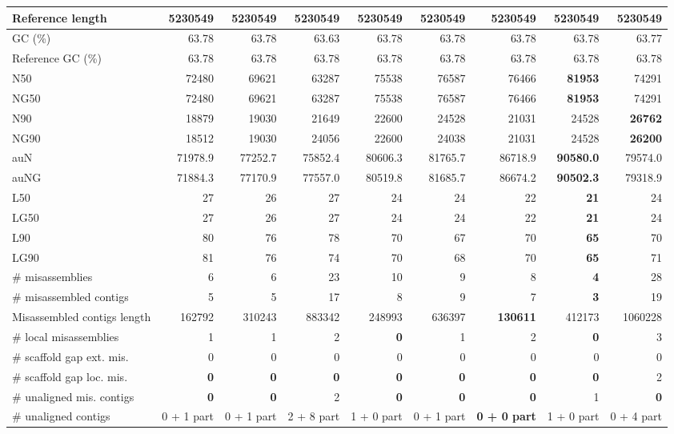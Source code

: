 \documentclass[12pt,a4paper]{article}
\begin{document}
\begin{table}[ht]
\begin{center}
\begin{tabular}{|l*{8}{|r}|}
Reference length & 5230549 & 5230549 & 5230549 & 5230549 & 5230549 & 5230549 & 5230549 & 5230549 \\ \hline
GC (\%) & 63.78 & 63.78 & 63.63 & 63.78 & 63.78 & 63.78 & 63.78 & 63.77 \\ \hline
Reference GC (\%) & 63.78 & 63.78 & 63.78 & 63.78 & 63.78 & 63.78 & 63.78 & 63.78 \\ \hline
N50 & 72480 & 69621 & 63287 & 75538 & 76587 & 76466 & {\bf 81953} & 74291 \\ \hline
NG50 & 72480 & 69621 & 63287 & 75538 & 76587 & 76466 & {\bf 81953} & 74291 \\ \hline
N90 & 18879 & 19030 & 21649 & 22600 & 24528 & 21031 & 24528 & {\bf 26762} \\ \hline
NG90 & 18512 & 19030 & 24056 & 22600 & 24038 & 21031 & 24528 & {\bf 26200} \\ \hline
auN & 71978.9 & 77252.7 & 75852.4 & 80606.3 & 81765.7 & 86718.9 & {\bf 90580.0} & 79574.0 \\ \hline
auNG & 71884.3 & 77170.9 & 77557.0 & 80519.8 & 81685.7 & 86674.2 & {\bf 90502.3} & 79318.9 \\ \hline
L50 & 27 & 26 & 27 & 24 & 24 & 22 & {\bf 21} & 24 \\ \hline
LG50 & 27 & 26 & 27 & 24 & 24 & 22 & {\bf 21} & 24 \\ \hline
L90 & 80 & 76 & 78 & 70 & 67 & 70 & {\bf 65} & 70 \\ \hline
LG90 & 81 & 76 & 74 & 70 & 68 & 70 & {\bf 65} & 71 \\ \hline
\# misassemblies & 6 & 6 & 23 & 10 & 9 & 8 & {\bf 4} & 28 \\ \hline
\# misassembled contigs & 5 & 5 & 17 & 8 & 9 & 7 & {\bf 3} & 19 \\ \hline
Misassembled contigs length & 162792 & 310243 & 883342 & 248993 & 636397 & {\bf 130611} & 412173 & 1060228 \\ \hline
\# local misassemblies & 1 & 1 & 2 & {\bf 0} & 1 & 2 & {\bf 0} & 3 \\ \hline
\# scaffold gap ext. mis. & 0 & 0 & 0 & 0 & 0 & 0 & 0 & 0 \\ \hline
\# scaffold gap loc. mis. & {\bf 0} & {\bf 0} & {\bf 0} & {\bf 0} & {\bf 0} & {\bf 0} & {\bf 0} & 2 \\ \hline
\# unaligned mis. contigs & {\bf 0} & {\bf 0} & 2 & {\bf 0} & {\bf 0} & {\bf 0} & 1 & {\bf 0} \\ \hline
\# unaligned contigs & 0 + 1 part & 0 + 1 part & 2 + 8 part & 1 + 0 part & 0 + 1 part & {\bf 0 + 0 part} & 1 + 0 part & 0 + 4 part \\ \hline

\end{tabular}
\end{center}
\end{table}
\end{document}
